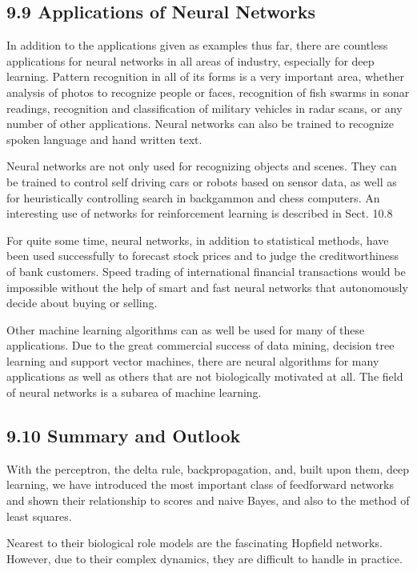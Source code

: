 \documentclass[10pt]{article}
\begin{document}
\subsection*{9.9 Applications of Neural Networks}
In addition to the applications given as examples thus far, there are countless applications for neural networks in all areas of industry, especially for deep learning. Pattern recognition in all of its forms is a very important area, whether analysis of photos to recognize people or faces, recognition of fish swarms in sonar readings, recognition and classification of military vehicles in radar scans, or any number of other applications. Neural networks can also be trained to recognize spoken language and hand written text.

Neural networks are not only used for recognizing objects and scenes. They can be trained to control self driving cars or robots based on sensor data, as well as for heuristically controlling search in backgammon and chess computers. An interesting use of networks for reinforcement learning is described in Sect. 10.8

For quite some time, neural networks, in addition to statistical methods, have been used successfully to forecast stock prices and to judge the creditworthiness of bank customers. Speed trading of international financial transactions would be impossible without the help of smart and fast neural networks that autonomously decide about buying or selling.


Other machine learning algorithms can as well be used for many of these applications. Due to the great commercial success of data mining, decision tree learning and support vector machines, there are neural algorithms for many applications as well as others that are not biologically motivated at all. The field of neural networks is a subarea of machine learning.

\subsection*{9.10 Summary and Outlook}
With the perceptron, the delta rule, backpropagation, and, built upon them, deep learning, we have introduced the most important class of feedforward networks and shown their relationship to scores and naive Bayes, and also to the method of least squares.

Nearest to their biological role models are the fascinating Hopfield networks. However, due to their complex dynamics, they are difficult to handle in practice.
\end{document}
